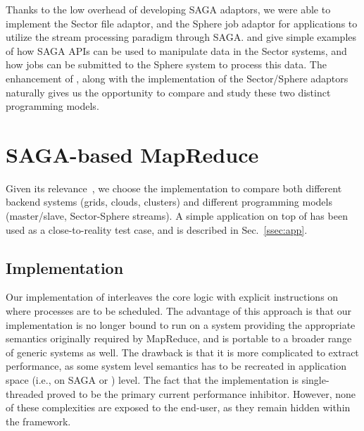 \documentclass[3p,twocolumn]{elsarticle}
\begin{document}
Thanks to the low overhead of developing SAGA adaptors, we were able
to implement the Sector file adaptor, and the Sphere job adaptor for
applications to utilize the stream processing paradigm through SAGA.
 and  give simple examples of how SAGA APIs
can be used to manipulate data in the Sector systems, and how jobs can
be submitted to the Sphere system to process this data.  The
enhancement of \sagamapreduce, along with the implementation of the
Sector/Sphere adaptors naturally gives us the opportunity to compare
and study these two distinct programming models.


\section{SAGA-based MapReduce}
\label{sec:mr}

 Given its relevance~\cite{saga_ccgrid09}, we choose the \smr
 implementation to compare both different backend systems (grids,
 clouds, clusters) and different programming models (master/slave,
 Sector-Sphere streams).  A simple \wc application on top of
 \smr has been used as a close-to-reality test case, and is
 described in Sec.~\ref{ssec:app}.


\subsection{\sagamapreduce Implementation}


Our implementation of \sagamapreduce interleaves the core \mr logic
with explicit instructions on where processes are to be scheduled.
The advantage of this approach is that our implementation is no longer
bound to run on a system providing the appropriate semantics
originally required by MapReduce, and is portable to a broader range
of generic systems as well.  The drawback is that it is more
complicated to extract performance, as some system level semantics has
to be recreated in application space (i.e., on SAGA or \smr) level.
The fact that the implementation is single-threaded proved to be the
primary current performance inhibitor.  However, none of these
complexities are exposed to the end-user, as they remain hidden within
the framework. 
\end{document}
